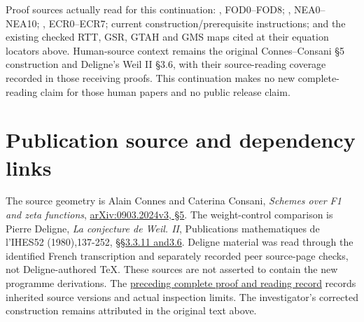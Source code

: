 Proof sources actually read for this continuation:
\href{https://github.com/KokunoYumeto/zeta-function-research-reader/blob/36a82ecca98addb8a98b48204e349737856c7223/workbenches/splitzero-tandem/continuations/20260924-cohomology-weight-and-character-lifts/gct-weight-control/proofs/CC_FULL_SOURCE_OBSTRUCTION_DECOMPOSITION.md}{},
FOD0--FOD8;
\href{https://github.com/KokunoYumeto/zeta-function-research-reader/blob/36a82ecca98addb8a98b48204e349737856c7223/workbenches/splitzero-tandem/continuations/20260924-cohomology-weight-and-character-lifts/gct-weight-control/proofs/CC_NORMAL_EXTENSION_ANNIHILATOR.md}{},
NEA0--NEA10;
\href{https://github.com/KokunoYumeto/zeta-function-research-reader/blob/main/workbenches/splitzero-tandem/continuations/20260925-full-source-tensor-and-original-divisor/gct/EXTENSION_CLASS_TO_ORIGINAL_RESIDUE.md}{},
ECR0--ECR7; current construction/prerequisite instructions; and the
existing checked RTT, GSR, GTAH and GMS maps cited at their equation
locators above. Human-source context remains the original
Connes--Consani §5 construction and Deligne's Weil II §3.6, with their
source-reading coverage recorded in those receiving proofs. This
continuation makes no new complete-reading claim for those human papers
and no public release claim.

\section{Publication source and dependency
links}\label{publication-source-and-dependency-links-3}

The source geometry is Alain Connes and Caterina Consani, \emph{Schemes
over F1 and zeta functions},
\href{https://arxiv.org/abs/0903.2024v3}{arXiv:0903.2024v3, §5}. The
weight-control comparison is Pierre Deligne, \emph{La conjecture de
Weil. II}, Publications mathematiques de l'IHES52 (1980),137-252,
\href{https://www.numdam.org/item/PMIHES_1980__52__137_0/}{§§3.3.11
and3.6}. Deligne material was read through the identified French
transcription and separately recorded peer source-page checks, not
Deligne-authored TeX. These sources are not asserted to contain the new
programme derivations. The
\href{https://github.com/KokunoYumeto/zeta-function-research-reader/blob/36a82ecca98addb8a98b48204e349737856c7223/workbenches/splitzero-tandem/continuations/20260924-cohomology-weight-and-character-lifts/BUILD_AND_REVIEW.md}{preceding
complete proof and reading record} records inherited source versions and
actual inspection limits. The investigator's corrected construction
remains attributed in the original text above.

